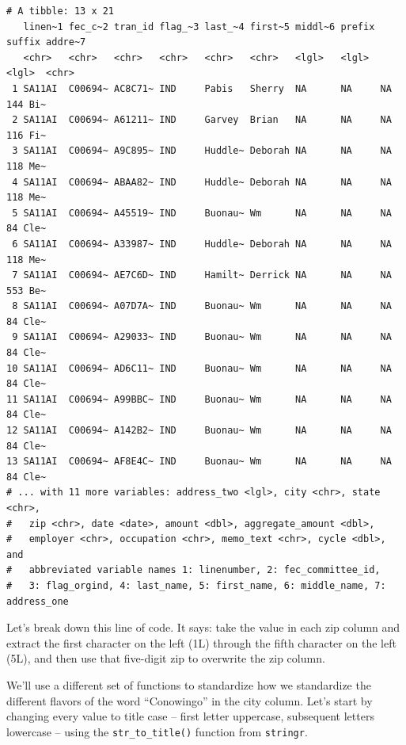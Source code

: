 \documentclass[
  letterpaper,
  DIV=11,
  numbers=noendperiod]{scrreprt}
\begin{document}
\begin{verbatim}
# A tibble: 13 x 21
   linen~1 fec_c~2 tran_id flag_~3 last_~4 first~5 middl~6 prefix suffix addre~7
   <chr>   <chr>   <chr>   <chr>   <chr>   <chr>   <lgl>   <lgl>  <lgl>  <chr>  
 1 SA11AI  C00694~ AC8C71~ IND     Pabis   Sherry  NA      NA     NA     144 Bi~
 2 SA11AI  C00694~ A61211~ IND     Garvey  Brian   NA      NA     NA     116 Fi~
 3 SA11AI  C00694~ A9C895~ IND     Huddle~ Deborah NA      NA     NA     118 Me~
 4 SA11AI  C00694~ ABAA82~ IND     Huddle~ Deborah NA      NA     NA     118 Me~
 5 SA11AI  C00694~ A45519~ IND     Buonau~ Wm      NA      NA     NA     84 Cle~
 6 SA11AI  C00694~ A33987~ IND     Huddle~ Deborah NA      NA     NA     118 Me~
 7 SA11AI  C00694~ AE7C6D~ IND     Hamilt~ Derrick NA      NA     NA     553 Be~
 8 SA11AI  C00694~ A07D7A~ IND     Buonau~ Wm      NA      NA     NA     84 Cle~
 9 SA11AI  C00694~ A29033~ IND     Buonau~ Wm      NA      NA     NA     84 Cle~
10 SA11AI  C00694~ AD6C11~ IND     Buonau~ Wm      NA      NA     NA     84 Cle~
11 SA11AI  C00694~ A99BBC~ IND     Buonau~ Wm      NA      NA     NA     84 Cle~
12 SA11AI  C00694~ A142B2~ IND     Buonau~ Wm      NA      NA     NA     84 Cle~
13 SA11AI  C00694~ AF8E4C~ IND     Buonau~ Wm      NA      NA     NA     84 Cle~
# ... with 11 more variables: address_two <lgl>, city <chr>, state <chr>,
#   zip <chr>, date <date>, amount <dbl>, aggregate_amount <dbl>,
#   employer <chr>, occupation <chr>, memo_text <chr>, cycle <dbl>, and
#   abbreviated variable names 1: linenumber, 2: fec_committee_id,
#   3: flag_orgind, 4: last_name, 5: first_name, 6: middle_name, 7: address_one
\end{verbatim}

Let's break down this line of code. It says: take the value in each zip
column and extract the first character on the left (1L) through the
fifth character on the left (5L), and then use that five-digit zip to
overwrite the zip column.

We'll use a different set of functions to standardize how we standardize
the different flavors of the word ``Conowingo'' in the city column.
Let's start by changing every value to title case -- first letter
uppercase, subsequent letters lowercase -- using the
\texttt{str\_to\_title()} function from \texttt{stringr}.
\end{document}
